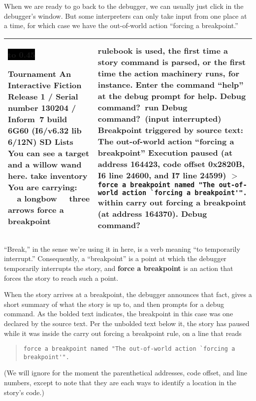 \documentclass{book}
\newcommand{\n}{\hspace*{\fill}\newline}
\newcommand{\terp}[2]{\begin{center}\begin{tabular}{p{0.45\textwidth}|p{0.45\textwidth}}\midrule #1&#2\\\midrule\end{tabular}\end{center}}
\newcommand{\glkheading}[1]{\textbf{#1}}
\newcommand{\glkinput}[1]{\textbf{#1}}
\newcommand{\glkstatusline}[2]{\centerline{\colorbox{black}{\hbox to 0.45\textwidth{\textcolor{white}{#1\hfil #2}}}}}
\newcommand{\storyprompt}{\raisebox{1.5pt}{\(>\)}}
\newcommand{\cursor}{\raisebox{-1.5pt}{\RectangleThin}}
\newcommand{\markedindent}{\(>\)\qquad}
\begin{document}
\pagebreak

When we are ready to go back to the debugger, we can usually just click in the
debugger's window.  But some interpreters can only take input from one place at
a time, for which case we have the out-of-world action ``forcing a breakpoint.''

\terp{\glkstatusline{Lists}{0/2}\n
  \glkheading{Tournament}\n
  An Interactive Fiction\n
  Release 1 / Serial number 130204 / Inform~7 build 6G60 (I6/v6.32 lib 6/12N) SD\n
  \n
  \glkheading{Lists}\n
  You can see a target and a willow wand here.\n
  \n
  \storyprompt\glkinput{take inventory}\n
  You are carrying:\n
  \null\ \ a longbow\n
  \null\ \ three arrows\n
  \n
  \storyprompt\glkinput{force a breakpoint}}{%
  rulebook is used, the first time a story command is parsed, or the first time the action machinery runs, for instance.\n
  \n
  Enter the command ``help'' at the debug prompt for help.\n
  \n
  Debug command?\ \glkinput{run}\n
  \n
  Debug command?\ (input interrupted)\n
  \glkheading{Breakpoint triggered by source text:} The out-of-world action ``forcing a breakpoint''\n
  \n
  Execution paused (at address 164423, code offset 0x2820B, I6 line 24600, and I7 line 24599)\n
  \markedindent \lstinline{force a breakpoint named "The out-of-world action `forcing a breakpoint'".}\n
  within carry out forcing a breakpoint (at address 164370).\n
  \n
  Debug command?\ \cursor}

``Break,'' in the sense we're using it in here, is a verb meaning ``to
temporarily interrupt.''  Consequently, a ``breakpoint'' is a point at which the
debugger temporarily interrupts the story, and \glkinput{force a breakpoint} is
an action that forces the story to reach such a point.

When the story arrives at a breakpoint, the debugger announces that fact, gives
a short summary of what the story is up to, and then prompts for a debug
command.  As the bolded text indicates, the breakpoint in this case was one
declared by the source text.  Per the unbolded text below it, the story has
paused while it was inside the carry out forcing a breakpoint rule, on a line
that reads

\begin{quote}
  \lstinline{force a breakpoint named "The out-of-world action `forcing a breakpoint'".}
\end{quote}

(We will ignore for the moment the parenthetical addresses, code offset, and
line numbers, except to note that they are each ways to identify a location in
the story's code.)
\end{document}
